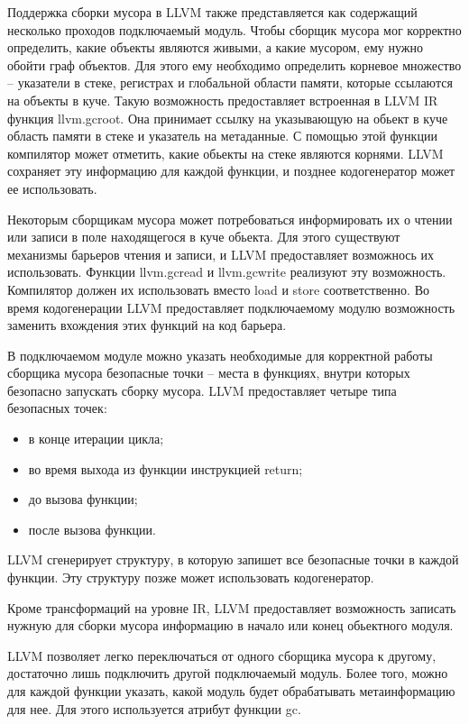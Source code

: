 Поддержка сборки мусора в LLVM также представляется как содержащий несколько проходов подключаемый модуль. Чтобы сборщик мусора мог корректно определить, какие объекты являются живыми, а какие мусором, ему нужно обойти граф объектов. Для этого ему необходимо определить корневое множество -- указатели в стеке, регистрах и глобальной области памяти, которые ссылаются на объекты в куче. Такую возможность предоставляет встроенная в LLVM IR функция llvm.gcroot. Она принимает ссылку на указывающую на обьект в куче область памяти в стеке и указатель на метаданные. С помощью этой функции компилятор может отметить, какие обьекты на стеке являются корнями. LLVM сохраняет эту информацию для каждой функции, и позднее кодогенератор может ее использовать.

Некоторым сборщикам мусора может потребоваться информировать их о чтении или записи в поле находящегося в куче обьекта. Для этого  существуют механизмы барьеров чтения и записи, и LLVM предоставляет возможнось их использовать. Функции llvm.gcread и llvm.gcwrite реализуют эту возможность. Компилятор должен их использовать вместо load и store соответственно. Во время кодогенерации LLVM предоставляет подключаемому модулю возможность заменить вхождения этих функций на код барьера.

В подключаемом модуле можно указать необходимые для корректной работы сборщика мусора безопасные точки -- места в функциях, внутри которых безопасно запускать сборку мусора. LLVM предоставляет четыре типа безопасных точек:
\begin{itemize}
\item
  в конце итерации цикла;
\item
  во время выхода из функции инструкцией return;
\item
  до вызова функции;
\item
  после вызова функции.
\end{itemize}
LLVM сгенерирует структуру, в которую запишет все безопасные точки в каждой функции. Эту структуру позже может использовать кодогенератор.

Кроме трансформаций на уровне IR, LLVM предоставляет возможность записать нужную для сборки мусора информацию в начало или конец обьектного модуля.

LLVM позволяет легко переключаться от одного сборщика мусора к другому, достаточно лишь подключить другой подключаемый модуль. Более того, можно для каждой функции указать, какой модуль будет обрабатывать метаинформацию для нее. Для этого используется атрибут функции gc. 

